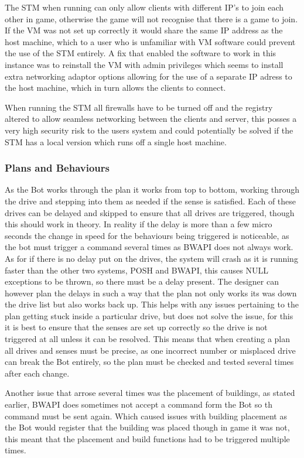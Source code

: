 \documentclass[journal]{IEEEtran}
\begin{document}
	The STM when running can only allow clients with different IP's to join each other in game, otherwise the game will not recognise that there is a game to join. If the VM was not set up correctly it would share the same IP address as the host machine, which to a user who is unfamiliar with VM software could prevent the use of the STM entirely. A fix that enabled the software to work in this instance was to reinstall the VM with admin privileges which seems to install extra networking adaptor options allowing for the use of a separate IP adress to the host machine, which in turn allows the clients to connect.
	
	When running the STM all firewalls have to be turned off and the registry altered to allow seamless networking between the clients and server, this posses a very high security risk to the users system and could potentially be solved if the STM has a local version which runs off a single host machine.
	\newline
	\subsubsection{Plans and Behaviours}
	As the Bot works through the plan it works from top to bottom, working through the drive and stepping into them as needed if the sense is satisfied. Each of these drives can be delayed and skipped to ensure that all drives are triggered, though this should work in theory. In reality if the delay is more than a few micro seconds the change in speed for the behaviours being triggered is noticeable, as the bot must trigger a command several times as BWAPI does not always work. As for if there is no delay put on the drives, the system will crash as it is running faster than the other two systems, POSH and BWAPI, this causes NULL exceptions to be thrown, so there must be a delay present. The designer can however plan the delays in such a way that the plan not only works its was down the drive list but also works back up. This helps with any issues pertaining to the plan getting stuck inside a particular drive, but does not solve the issue, for this it is best to ensure that the senses are set up correctly so the drive is not triggered at all unless it can be resolved. This means that when creating a plan all drives and senses must be precise, as one incorrect number or misplaced drive can break the Bot entirely, so the plan must be checked and tested several times after each change.
	
	Another issue that arrose several times was the placement of buildings, as stated earlier, BWAPI does sometimes not accept a command form the Bot so th command must be sent again. Which caused issues with building placement as the Bot would register that the building was placed though in game it was not, this meant that the placement and build functions had to be triggered multiple times. 
	
\end{document}
